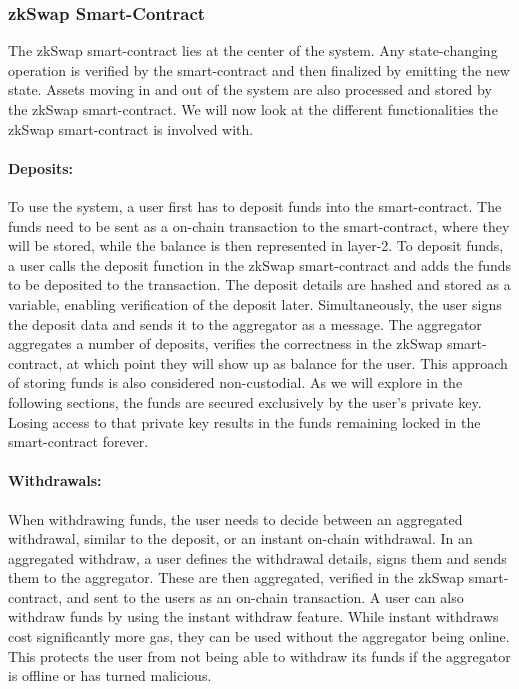 \documentclass[../../thesis.tex]{subfiles}
\begin{document}
\subsubsection{zkSwap Smart-Contract}
The zkSwap smart-contract lies at the center of the system. Any state-changing operation is verified by the smart-contract and then finalized by emitting the new state. Assets moving in and out of the system are also processed and stored by the zkSwap smart-contract. We will now look at the different functionalities the zkSwap smart-contract is involved with. 

\paragraph{Deposits:}
To use the system, a user first has to deposit funds into the smart-contract. The funds need to be sent as a on-chain transaction to the smart-contract, where they will be stored, while the balance is then represented in layer-2. To deposit funds, a user calls the deposit function in the zkSwap smart-contract and adds the funds to be deposited to the transaction. The deposit details are hashed and stored as a variable, enabling verification of the deposit later. Simultaneously, the user signs the deposit data and sends it to the aggregator as a message. The aggregator aggregates a number of deposits, verifies the correctness in the zkSwap smart-contract, at which point they will show up as balance for the user. This approach of storing funds is also considered non-custodial. As we will explore in the following sections, the funds are secured exclusively by the user's private key. Losing access to that private key results in the funds remaining locked in the smart-contract forever. 

\paragraph{Withdrawals:}
When withdrawing funds, the user needs to decide between an aggregated withdrawal, similar to the deposit, or an instant on-chain withdrawal. In an aggregated withdraw, a user defines the withdrawal details, signs them and sends them to the aggregator. These are then aggregated, verified in the zkSwap smart-contract, and sent to the users as an on-chain transaction. A user can also withdraw funds by using the instant withdraw feature. While instant withdraws cost significantly more gas, they can be used without the aggregator being online. This protects the user from not being able to withdraw its funds if the aggregator is offline or has turned malicious.
\end{document}
